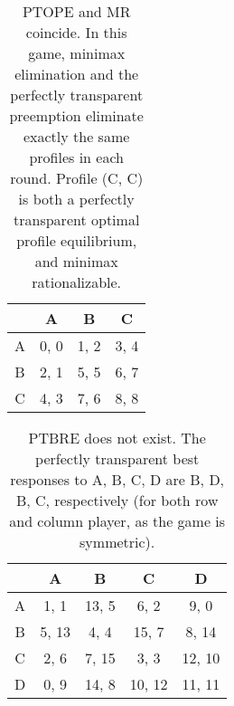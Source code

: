 \begin{table}
	\caption{
		PTOPE and MR coincide.
		In this game, minimax elimination and the perfectly transparent preemption eliminate exactly the same profiles in each round.
		Profile (C, C) is both a perfectly transparent optimal profile equilibrium, and minimax rationalizable.
	}
	\label{tab:PTOPE-eq-minimax}
	\centering
	\begin{tabular}{|c|c|c|c|}
		\hline
			& A		& B	   & C	  \\
		\hline
		A 		&\cellcolor{gray!70} 0, 0 &\cellcolor{gray!70} 1, 2 &\cellcolor{gray!70} 3, 4 \\
		\hline
		B		&\cellcolor{gray!70} 2, 1 &\cellcolor{gray!20} 5, 5 &\cellcolor{gray!20} 6, 7 \\
		\hline
		C		&\cellcolor{gray!70} 4, 3 &\cellcolor{gray!20} 7, 6 &\cellcolor{gray!00} 8, 8 \\
		\hline
	\end{tabular}
\end{table}


\begin{table}
	\caption{
		PTBRE does not exist.
		The perfectly transparent best responses to A, B, C, D are B, D, B, C, respectively (for both row and column player, as the game is symmetric).
	}
	\label{tab:no-ptbre}
	\centering
	\begin{tabular}{|c|c|c|c|c|}
		\hline
			& A		& B	   & C	 & D	 \\
		\hline
		A 		&\cellcolor{gray!70}  1,  1 &\cellcolor{gray!20} 13,  5 &\cellcolor{gray!70}  6,  2 &\cellcolor{gray!70}  9,  0 \\
		\hline
		B		&\cellcolor{gray!20}  5, 13 &\cellcolor{gray!20}  4,  4 &\cellcolor{gray!20} 15,  7 &\cellcolor{gray!20}  8, 14 \\
		\hline
		C		&\cellcolor{gray!70}  2,  6 &\cellcolor{gray!20}  7, 15 &\cellcolor{gray!70}  3,  3 &\cellcolor{gray!20} 12, 10 \\
		\hline
		D		&\cellcolor{gray!70}  0,  9 &\cellcolor{gray!20} 14,  8 &\cellcolor{gray!20} 10, 12 &\cellcolor{gray!20} 11, 11 \\
		\hline
	\end{tabular}
\end{table}


